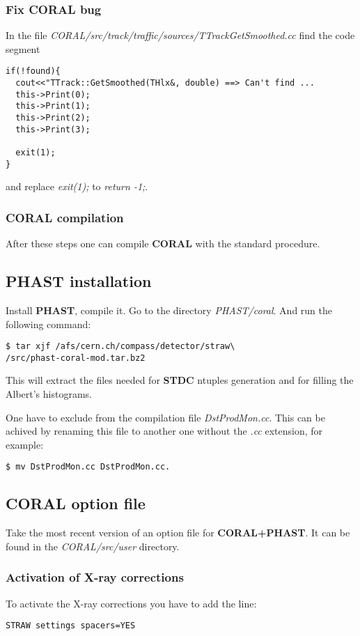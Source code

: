 \documentclass[a4paper,12pt]{article}
\begin{document}
\subsubsection{Fix CORAL bug}
In the file {\it CORAL/src/track/traffic/sources/TTrackGetSmoothed.cc}
find the code segment
\begin{verbatim}
if(!found){
  cout<<"TTrack::GetSmoothed(THlx&, double) ==> Can't find ...
  this->Print(0);
  this->Print(1);
  this->Print(2);
  this->Print(3);

  exit(1);
}
\end{verbatim}
and replace {\it exit(1);} to {\it return -1;}.

\subsubsection{CORAL compilation}
After these steps one can compile {\bf CORAL} with the standard procedure.

\subsection{{\bf PHAST} installation}
Install {\bf PHAST}, compile it. Go to the directory {\it PHAST/coral}.
And run the following command:
\begin{verbatim}
$ tar xjf /afs/cern.ch/compass/detector/straw\
/src/phast-coral-mod.tar.bz2
\end{verbatim}
This will extract the files needed for {\bf STDC} ntuples generation and
for filling the Albert's histograms.

One have to exclude from the compilation file {\it DstProdMon.cc}. This can be
achived by renaming this file to another one without the {\it .cc} extension,
for example:
\begin{verbatim}
$ mv DstProdMon.cc DstProdMon.cc.
\end{verbatim}

\subsection{CORAL option file}
Take the most recent version of an option file for {\bf CORAL+PHAST}.
It can be found in the {\it CORAL/src/user} directory.
\subsubsection{Activation of X-ray corrections}
To activate the X-ray corrections you have to add the line:
\begin{verbatim}
STRAW settings spacers=YES
\end{verbatim}
\end{document}
